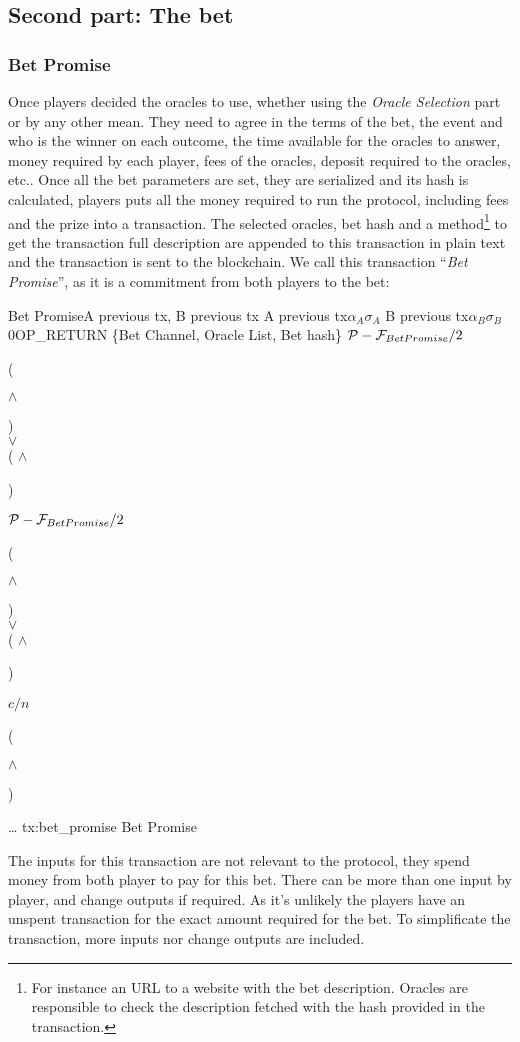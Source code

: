 \subsection{Second part: The bet}

\subsubsection{Bet Promise}
Once players decided the oracles to use, whether using the \textit{Oracle
  Selection} part or by any other mean.
They need to agree in the terms of the bet, the event and who is the winner on
  each outcome, the time available for the oracles to answer, money required by
  each player, fees of the  oracles, deposit required to the oracles, etc..
Once all the bet parameters are set, they are serialized and its hash is
  calculated, players puts all the money required to run the protocol,
  including fees and the prize into a transaction.
The selected oracles, bet hash and a method\footnote{For instance an URL to a
  website with the bet description. Oracles are responsible to check the
  description fetched with the hash provided in the transaction.} to get the
  transaction full description are appended to this transaction in plain text
  and the transaction is sent to the blockchain.
We call this transaction ``\textit{Bet Promise}'', as it is a commitment from both
  players to the bet:

\transaction
    {Bet Promise}{A previous tx, B previous tx}
    {A previous tx}{$\alpha_A$}{$\sigma_A$}
    {B previous tx}{$\alpha_B$}{$\sigma_B$}
    \stopinputs
    {0}{\footnotesize{OP\_RETURN \{Bet Channel, Oracle List, Bet hash\}}}
    {$\mathcal{P} - \mathcal{F}_{Bet Promise} / 2$}{(\signature{A} $\wedge$ \signature{B}) \\
                                                   $\vee$ \\
                                            ( $\wedge$ \signature{A}) }
    {$\mathcal{P} - \mathcal{F}_{Bet Promise} / 2$}{(\signature{A} $\wedge$ \signature{B}) \\
                                                   $\vee$ \\
                                            ( $\wedge$ \signature{B}) }
    {$c/n$}{(\signature{A} $\wedge$ \signature{B})}
    {\ldots }{}
    \stopoutputs
    {tx:bet_promise}
    {Bet Promise}

The inputs for this transaction are not relevant to the protocol, they spend
  money from both player to pay for this bet.
There can be more than one input by player, and change outputs if required.
As it's unlikely the players have an unspent transaction for the exact amount
  required for the bet.
To simplificate the transaction, more inputs nor change outputs are included.

